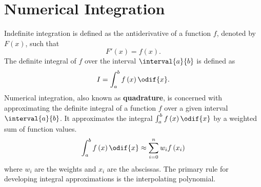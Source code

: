 \documentclass{article}
\begin{document}
\section{Numerical Integration}
Indefinite integration is defined as the antiderivative of a function
\(f\), denoted by \(F\left( x \right)\), such that
\begin{equation*}
    F'\left( x \right) = f\left( x \right).
\end{equation*}
The definite integral of \(f\) over the interval \(\interval{a}{b}\) is
defined as
\begin{equation*}
    I = \int_a^b f\left( x \right) \odif{x}.
\end{equation*}
Numerical integration, also known as \textbf{quadrature}, is concerned
with approximating the definite integral of a function \(f\) over a
given interval \(\interval{a}{b}\). It approximates the integral
\(\int_a^b f\left( x \right) \odif{x}\) by a weighted sum of function
values.
\begin{equation*}
    \int_a^b f\left( x \right) \odif{x} \approx \sum_{i = 0}^n w_i f\left( x_i \right)
\end{equation*}
where \(w_i\) are the weights and \(x_i\) are the abscissas. The primary
rule for developing integral approximations is the interpolating
polynomial.
\end{document}

